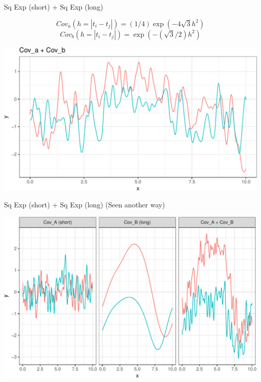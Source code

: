 \documentclass[11pt,ignorenonframetext,]{beamer}
\begin{document}
\begin{frame}[t]{%
\protect\hypertarget{sq-exp-short-sq-exp-long}{%
Sq Exp (short) + Sq Exp (long)}}

\vspace{-5mm}

\[ Cov_a(h = |t_i - t_j|) = (1/4) \exp(-4\sqrt{3}h^2) \]
\[ Cov_b(h = |t_i - t_j|) = \exp(-(\sqrt{3}/2)h^2) \]

\begin{center}\includegraphics[width=\textwidth]{Lec14_files/figure-beamer/unnamed-chunk-12-1} \end{center}

\end{frame}

\begin{frame}[t]{%
\protect\hypertarget{sq-exp-short-sq-exp-long-seen-another-way}{%
Sq Exp (short) + Sq Exp (long) (Seen another way)}}

\begin{center}\includegraphics[width=\textwidth]{Lec14_files/figure-beamer/unnamed-chunk-13-1} \end{center}

\end{frame}
\end{document}
